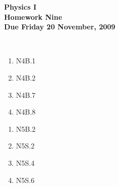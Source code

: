\documentclass[12pt]{article}
\begin{document}
\pagestyle{empty}
 
\begin{center}
{\large {\bf Physics I}}\\
\medskip
{\large {\bf Homework Nine}}\\
\medskip
{ {\bf Due Friday 20  November, 2009}}\\
\end{center}

\hspace{2mm}\\


\begin{enumerate}
\setlength{\itemsep}{-1mm}
  \item N4B.1
  \item N4B.2
  \item N4B.7
  \item N4B.8
\end{enumerate}


\begin{enumerate}
\setlength{\itemsep}{-1mm}
  \item N5B.2
  \item N5S.2
  \item N5S.4
  \item N5S.6
\end{enumerate}
\end{document}
